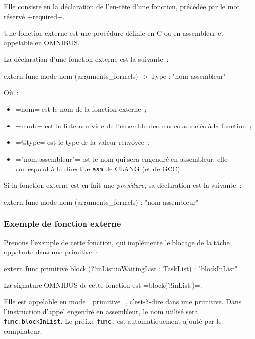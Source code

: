 Elle consiste en la déclaration de l'en-tête d'une fonction, précédée par le mot réservé \omnibus+required+.








Une fonction externe est une procédure définie en C ou en assembleur et appelable en OMNIBUS.

La déclaration d'une fonction externe est la suivante~:

\begin{OMNIBUS}
extern func mode nom (arguments_formels) -> Type : "nom-assembleur"
\end{OMNIBUS}
Où~:
\begin{itemize}
  \item \omnibus=nom= est le nom de la fonction externe~;
  \item \omnibus=mode= est la liste non vide de l'ensemble des modes associés à la fonction~;
  \item \omnibus=@type= est le type de la valeur renvoyée~;
  \item \omnibus="nom-assembleur"= est le nom qui sera engendré en assembleur, elle correspond à la directive \texttt{asm} de CLANG (et de GCC).
\end{itemize}

Si la fonction externe est en fait une \emph{procédure}, sa déclaration est la suivante~:

\begin{OMNIBUS}
extern func mode nom (arguments_formels) : "nom-assembleur"
\end{OMNIBUS}

\subsubsection{Exemple de fonction externe}

Prenons l'exemple de cette fonction, qui implémente le blocage de la tâche appelante dans une primitive~:

\begin{OMNIBUS}
extern func
primitive block (?!inList:ioWaitingList : TaskList) : "blockInList"
\end{OMNIBUS}

La signature OMNIBUS de cette fonction est \omnibus=block(?!inList:)=.

Elle est appelable en mode \omnibus=primitive=, c'est-à-dire dans une primitive. Dans l'instruction d'appel engendré en assembleur, le nom utilisé sera \texttt{func.blockInList}. Le préfixe \texttt{func.} est automatiquement ajouté par le compilateur.

